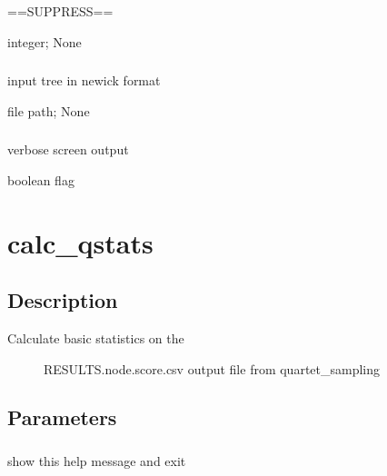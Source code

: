 \documentclass[letterpaper,12pt,english]{sphinxmanual}
\begin{document}
\subsubsection{}
\label{\detokenize{prog_desc:id12}}
 ==SUPPRESS==

 integer;  None


\subsubsection{}
\label{\detokenize{prog_desc:tree}}
 input tree in newick format

 file path;  None


\subsubsection{}
\label{\detokenize{prog_desc:id13}}
 verbose screen output

 boolean flag


\section{calc\_qstats}
\label{\detokenize{prog_desc:calc-qstats}}

\subsection{Description}
\label{\detokenize{prog_desc:id14}}\begin{description}
\item[{Calculate basic statistics on the}] \leavevmode
RESULTS.node.score.csv output file
from quartet\_sampling

\end{description}


\subsection{Parameters}
\label{\detokenize{prog_desc:id15}}

\subsubsection{}
\label{\detokenize{prog_desc:id16}}
 show this help message and exit
\end{document}
